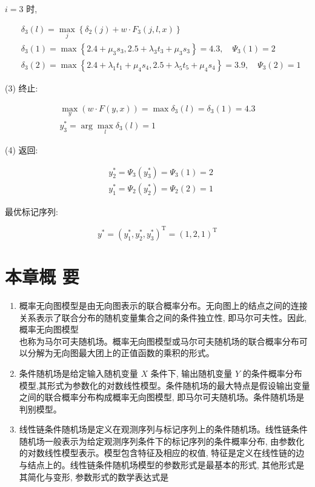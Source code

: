 \documentclass[10pt]{article}
\begin{document}
\begin{CJK*}{UTF8}{bsmi}
$i=3$ 时,

$$
\begin{aligned}
& \delta_{3}(l)=\max _{j}\left\{\delta_{2}(j)+w \cdot F_{3}(j, l, x)\right\} \\
& \delta_{3}(1)=\max \left\{2.4+\mu_{3} s_{3}, 2.5+\lambda_{3} t_{3}+\mu_{3} s_{3}\right\}=4.3, \quad \Psi_{3}(1)=2 \\
& \delta_{3}(2)=\max \left\{2.4+\lambda_{1} t_{1}+\mu_{4} s_{4}, 2.5+\lambda_{5} t_{5}+\mu_{4} s_{4}\right\}=3.9, \quad \Psi_{3}(2)=1
\end{aligned}
$$

(3) 终止:

$$
\begin{gathered}
\max _{y}(w \cdot F(y, x))=\max \delta_{3}(l)=\delta_{3}(1)=4.3 \\
y_{3}^{*}=\arg \max _{l} \delta_{3}(l)=1
\end{gathered}
$$

(4) 返回:

$$
\begin{aligned}
& y_{2}^{*}=\Psi_{3}\left(y_{3}^{*}\right)=\Psi_{3}(1)=2 \\
& y_{1}^{*}=\Psi_{2}\left(y_{2}^{*}\right)=\Psi_{2}(2)=1
\end{aligned}
$$

最优标记序列:

$$
y^{*}=\left(y_{1}^{*}, y_{2}^{*}, y_{3}^{*}\right)^{\mathrm{T}}=(1,2,1)^{\mathrm{T}}
$$

\section*{本章概 要}
\begin{enumerate}
  \item 概率无向图模型是由无向图表示的联合概率分布。无向图上的结点之间的连接关系表示了联合分布的随机变量集合之间的条件独立性, 即马尔可夫性。因此, 概率无向图模型\\
也称为马尔可夫随机场。概率无向图模型或马尔可夫随机场的联合概率分布可以分解为无向图最大团上的正值函数的乘积的形式。

  \item 条件随机场是给定输入随机变量 $X$ 条件下, 输出随机变量 $Y$ 的条件概率分布模型,其形式为参数化的对数线性模型。条件随机场的最大特点是假设输出变量之间的联合概率分布构成概率无向图模型, 即马尔可夫随机场。条件随机场是判别模型。

  \item 线性链条件随机场是定义在观测序列与标记序列上的条件随机场。线性链条件随机场一般表示为给定观测序列条件下的标记序列的条件概率分布, 由参数化的对数线性模型表示。模型包含特征及相应的权值, 特征是定义在线性链的边与结点上的。线性链条件随机场模型的参数形式是最基本的形式, 其他形式是其简化与变形, 参数形式的数学表达式是


\end{enumerate}
\end{CJK*}
\end{document}
